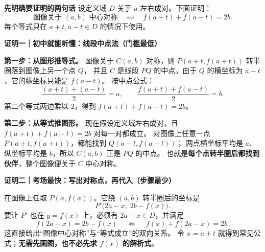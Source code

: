 \clearpage
\begin{proofbox}
\textbf{\textcolor{CProof}{先明确要证明的两句话}}
设定义域 $D$ 关于 $a$ 左右成对。下面证明：
\[
\text{图像关于 }(a,b)\text{ 中心对称}
\quad\Longleftrightarrow\quad
f(a+t)+f(a-t)=2b.
\]
每个等式只在 $a+t,a-t\in D$ 的情况下使用。

\medskip
\textbf{\textcolor{CProof}{证明一｜初中就能听懂：线段中点法（门槛最低）}}



\textbf{第一步：从图形推等式。}
图像关于 $C(a,b)$ 对称，则 $P(a+t,f(a+t))$ 转半圈落到图像上另一个点 $Q$，
并且 $C$ 是线段 $PQ$ 的中点。由于 $Q$ 的横坐标为 $a-t$，它的纵坐标只能是 $f(a-t)$。
按中点公式：
\[
\frac{(a+t)+(a-t)}2=a,\qquad
\frac{f(a+t)+f(a-t)}2=b.
\]
第二个等式两边乘以 $2$，得到 $f(a+t)+f(a-t)=2b$。

\textbf{第二步：从等式推图形。}
现在假设定义域左右成对，且 $f(a+t)+f(a-t)=2b$ 对每一对都成立。
对图像上任意一点 $P(a+t,f(a+t))$，都能找到 $Q(a-t,f(a-t))$；
两点横坐标平均是 $a$、纵坐标平均是 $b$，所以 $C(a,b)$ 正是 $PQ$ 的中点。
也就是\textbf{每个点转半圈后都找到伙伴}，整个图像便关于 $C$ 中心对称。

\medskip

\end{proofbox}
\clearpage
\begin{proofbox}
\textbf{\textcolor{CProof}{证明二｜考场最快：写出对称点，再代入（步骤最少）}}



在图像上任取 $P(x,f(x))$。它绕 $(a,b)$ 转半圈后的坐标是
\[
P'\bigl(2a-x,\;2b-f(x)\bigr).
\]
要让 $P'$ 也在 $y=f(x)$ 上，必须有 $2a-x\in D$，并满足
\[
\boxed{\ f(2a-x)=2b-f(x)\ }
\quad\Longleftrightarrow\quad
\boxed{\ f(x)+f(2a-x)=2b\ }.
\]
这直接给出“图像中心对称”与“等式成立”的双向关系。
令 $x=a+t$ 就得到常见公式；\textbf{无需先画图，也不必先求 $f(x)$ 的解析式}。

\medskip

\end{proofbox}
\clearpage
